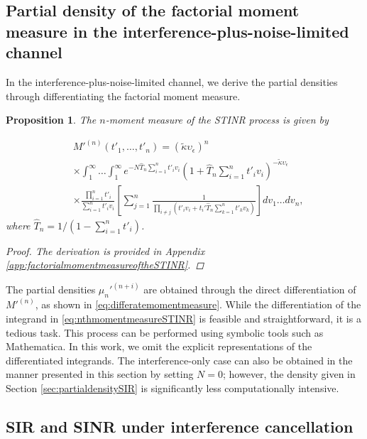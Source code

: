 \documentclass[lettersize,journal]{IEEEtran}
\newtheorem{prop}[theorem]{Proposition}
\begin{document}
\subsection{Partial density of the factorial moment measure in the interference-plus-noise-limited channel}


In the interference-plus-noise-limited channel, we derive the partial densities through differentiating the factorial moment measure.

\begin{prop}
  The $n$-moment measure of the STINR process is given by

  \begin{align}
    \label{eq:nthmomentmeasureSTINR}
      &M'^{(n)}(t'_1,\dots,t'_n) =\left(\tilde{\kappa} \upsilon_{\epsilon}\right)^n \nonumber\\
      &\times \int_1^{\infty}\dots\int_1^{\infty} e^{-N\hat{T}_n\sum\limits_{i=1}^nt'_iv_i} \left(1+\hat{T}_n\sum\limits_{i=1}^nt'_iv_i\right)^{-\tilde{\kappa}\upsilon_{\epsilon}} \nonumber\\
      &\times \frac{\prod\limits_{i=1}^nt'_i}{\sum\limits_{i=1}^nt'_iv_i}  \left[\sum\limits_{j=1}^n\frac{1}{\prod\limits_{i\neq j}\left(t'_i v_i+ t_i'\hat{T}_n\sum\limits_{k=1}^nt'_kv_k \right)} \right] dv_1 \dots dv_n,
    \end{align}
    where $\hat{T}_n= 1/(1-\sum_{i=1}^nt'_i)$.

    \begin{proof}
      The derivation is provided in Appendix \ref{app:factorialmomentmeasureoftheSTINR}.
    \end{proof}

\end{prop}
 


The partial densities $\mu_{n}'^{(n+i)}$ are obtained through the direct differentiation of $M'^{(n)}$, as shown in \eqref{eq:differatemomentmeasure}. While the differentiation of the integrand in \eqref{eq:nthmomentmeasureSTINR} is feasible and straightforward, it is a tedious task. This process can be performed using symbolic tools such as Mathematica. In this work, we omit the explicit representations of the differentiated integrands. The interference-only case can also be obtained in the manner presented in this section by setting $N=0$; however, the density given in Section \ref{sec:partialdensitySIR} is significantly less computationally intensive.


\subsection{SIR and SINR under interference cancellation}
\end{document}
